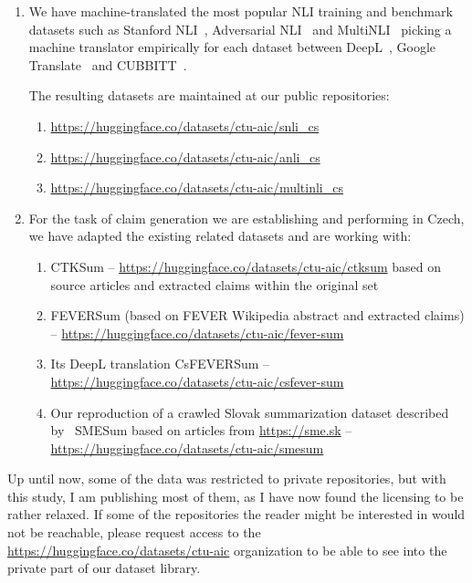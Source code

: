 \begin{enumerate}
    \item We have machine-translated the most popular NLI training and benchmark datasets such as Stanford NLI~\cite{snli:emnlp2015}, Adversarial NLI~\cite{anli} and MultiNLI~\cite{multinli} picking a machine translator empirically for each dataset between DeepL~\cite{deepl}, Google Translate~\cite{googletranslation} and CUBBITT~\cite{popel2020Transforming}.
    
    The resulting datasets are maintained at our public repositories:
    \begin{enumerate}
        \item \url{https://huggingface.co/datasets/ctu-aic/snli_cs}
        \item \url{https://huggingface.co/datasets/ctu-aic/anli_cs}
        \item \url{https://huggingface.co/datasets/ctu-aic/multinli_cs}
    \end{enumerate}
    \item For the task of claim generation we are establishing and performing in Czech, we have adapted the existing related datasets and are working with:
    \begin{enumerate}
        \item CTKSum -- \url{https://huggingface.co/datasets/ctu-aic/ctksum} based on source articles and extracted claims within the original \CTK{} set
        \item FEVERSum (based on FEVER Wikipedia abstract and extracted claims) -- \url{https://huggingface.co/datasets/ctu-aic/fever-sum}
        \item Its DeepL translation CsFEVERSum -- \url{https://huggingface.co/datasets/ctu-aic/csfever-sum}
        \item Our reproduction of a crawled Slovak summarization dataset described by~\cite{suppa-adamec-2020-summarization} SMESum based on articles from \url{https://sme.sk} -- \url{https://huggingface.co/datasets/ctu-aic/smesum}
    \end{enumerate}
\end{enumerate}
Up until now, some of the data was restricted to private repositories, but with this study, I am publishing most of them, as I have now found the licensing to be rather relaxed.
If some of the repositories the reader might be interested in would not be reachable, please request access to the  \url{https://huggingface.co/datasets/ctu-aic} organization to be able to see into the private part of our dataset library.

